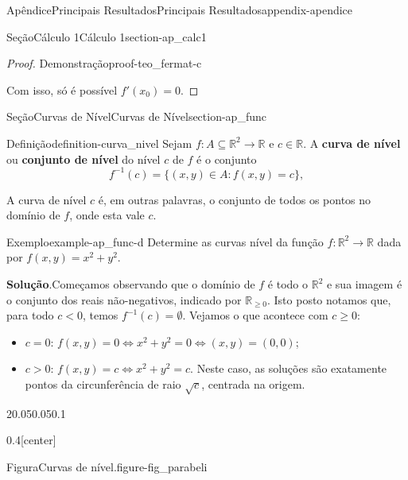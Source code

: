 \documentclass[oneside,10pt,]{book}
\newcommand{\blocktitlefont}{\relax}
\newcommand{\terminology}[1]{\textbf{#1}}
\numberwithin{equation}{section}
\newcommand{\R}{\mathbb R}
\begin{document}
\begin{appendixptx}{Apêndice}{Principais Resultados}{}{Principais Resultados}{}{}{appendix-apendice}
\begin{sectionptx}{Seção}{Cálculo 1}{}{Cálculo 1}{}{}{section-ap_calc1}
\begin{proof}{Demonstração}{}{proof-teo_fermat-c}
\begin{itemize}[label=\textbullet]
\end{itemize}
Com isso, só é possível \(f'(x_0)=0\).%
\end{proof}
\end{sectionptx}
%
%
\typeout{************************************************}
\typeout{************************************************}
%
\begin{sectionptx}{Seção}{Curvas de Nível}{}{Curvas de Nível}{}{}{section-ap_func}
\begin{definition}{Definição}{}{definition-curva_nivel}%
Sejam \(f\colon A\subseteq\R^2\to\R\) e \(c\in\R\). A \terminology{curva de nível} ou \terminology{conjunto de nível} do nível \(c\) de \(f\) é o conjunto%
\begin{equation*}
f^{-1}(c)=\{(x,y)\in
A\colon f(x,y)=c\},
\end{equation*}
\end{definition}
A curva de nível \(c\) é, em outras palavras, o conjunto de todos os pontos no domínio de \(f\), onde esta vale \(c\).%
\begin{example}{Exemplo}{}{example-ap_func-d}%
Determine as curvas nível da função \(f\colon\R^2\to\R\) dada por \(f(x,y)=x^2+y^2\).%
\par\smallskip%
\noindent\textbf{\blocktitlefont Solução}.\hypertarget{solution-ap_func-d-b}{}\quad{}Começamos observando que o domínio de \(f\) é todo o \(\R^2\) e sua imagem é o conjunto dos reais não-negativos, indicado por \(\R_{\geq 0}\). Isto posto notamos que, para todo \(c<0\), temos \(f^{-1}(c)=\emptyset\). Vejamos o que acontece com \(c\geq0\):%
\begin{itemize}[label=\textbullet]
\item{}\(c=0\): \(f(x,y)=0\iff x^2+y^2=0\iff
(x,y)=(0,0)\);%
\item{}\(c>0\): \(f(x,y)=c\iff x^2+y^2=c\). Neste caso, as soluções são exatamente pontos da circunferência de raio \(\sqrt{c}\), centrada na origem.%
\end{itemize}
\begin{sidebyside}{2}{0.05}{0.05}{0.1}%
\begin{sbspanel}{0.4}[center]%
\begin{panelfigureptx}{Figura}{Curvas de nível.}{figure-fig_parabeli}{}%
\end{panelfigureptx}
\end{sbspanel}
\end{sidebyside}
\end{example}
\end{sectionptx}
\end{appendixptx}
\end{document}
